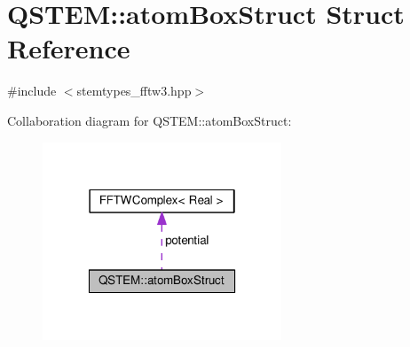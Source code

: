 \hypertarget{struct_q_s_t_e_m_1_1atom_box_struct}{\section{Q\-S\-T\-E\-M\-:\-:atom\-Box\-Struct Struct Reference}
\label{struct_q_s_t_e_m_1_1atom_box_struct}
}


{\ttfamily \#include $<$stemtypes\-\_\-fftw3.\-hpp$>$}



Collaboration diagram for Q\-S\-T\-E\-M\-:\-:atom\-Box\-Struct\-:
\nopagebreak
\begin{figure}[H]
\begin{center}
\leavevmode
\includegraphics[width=202pt]{struct_q_s_t_e_m_1_1atom_box_struct__coll__graph}
\end{center}
\end{figure}
